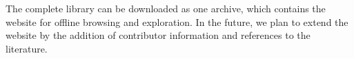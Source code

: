 The complete library can be downloaded as one archive, which contains the website for offline browsing and exploration.
%
In the future, we plan to extend the website by the addition of contributor information and references to the literature.



